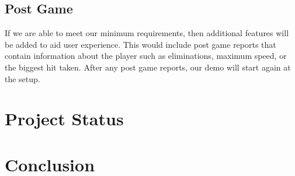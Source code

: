 \documentclass[11pt]{ieeeconf}
\begin{document}
\subsection{Post Game}
If we are able to meet our minimum requirements, then additional features will be added to aid user experience. This would include post game reports that contain information about the player such as eliminations, maximum speed, or the biggest hit taken. After any post game reports, our demo will start again at the setup.

\section{Project Status}

\section{Conclusion}



\end{document}
